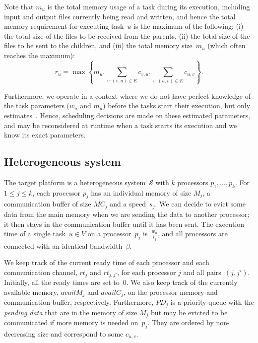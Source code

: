 \documentclass[conference]{IEEEtran}
\newcommand{\cluster}{\,\mathcal{S}}
\newcommand{\MM}{M}
\newcommand{\rt}{rt}
\newcommand{\PD}{PD}
\newcommand{\hmey}[1]{{\color{red}[HM: #1]}}
\newcommand{\AB}[1]{{\color{purple}[AB: #1]}}
\begin{document}
Note that $m_u$ is the total memory usage
of a task during its execution, including input and output files currently being read and written,
and hence the total memory requirement for executing task~$u$ is the maximum of the following:
(i) the total size of the files to be received from the parents, (ii) the total size of the files
to be sent to the children, and (iii) the total memory size~$m_u$ (which often reaches the maximum):
\[
    r_u = \max\left\{m_u , \sum_{v:(v,u)\in E}c_{v,u}, \sum_{v:(u,v)\in E} c_{u,v}\right\}.
\]

Furthermore, we operate in a context where we do not have perfect knowledge
of the task parameters ($w_u$ and $m_u$) before the tasks start their execution,
but only estimates~\cite{rahman2013,GARG2015256}.  
Hence, scheduling decisions are made on these estimated parameters, and
may be reconsidered at runtime when a task starts its execution and we know its exact parameters.


\subsection{Heterogeneous system}
\label{sec.mod.plat}
%
The target platform is a heterogeneous system $\cluster$ with $k$ processors 
    $p_1, \dots, p_k$.
    For $1 \leq j \leq k$, each processor $p_j$  has an individual memory of size $M_j$, a communication
    buffer of size $MC_j$ and a speed~$s_j$.
    We can decide to evict some data from the main memory when we are sending the data
    to another processor; it then stays in the communication buffer until it has been sent.
    The execution time of a single task~$u\in V$ on a processor~$p_j$ is~$\frac{w_u}{s_j}$,
    and all 
    processors are connected with an identical bandwidth~$\beta$.

    We keep track of the current ready time of each processor and each communication
    channel, $\rt_j$ and $\rt_{j,j'}$, for each processor $j$ and all pairs~$(j,j')$.
    Initially, all the ready times are set to~$0$.
    We also keep track of the currently available memory, $availM_j$ and $availC_j$,
    on the processor memory and communication buffer, respectively.
    Furthermore, $\PD_j$ is a priority queue with the {\em pending data}
    that are in the memory of size $\MM_j$ but may be evicted to be communicated if
    more memory is needed on~$p_j$. They are ordered by non-decreasing size and
    correspond to some $c_{u,v}$.
\end{document}
